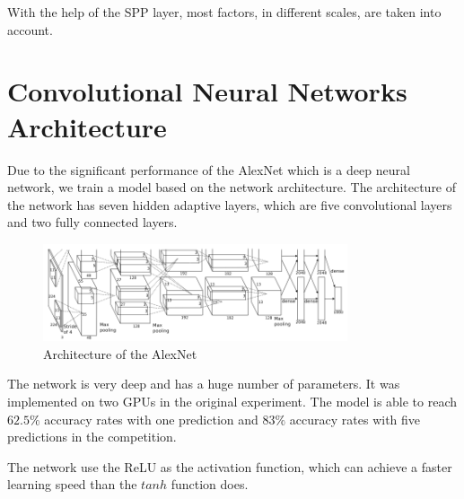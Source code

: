With the help of the SPP layer, most factors, in different scales, are taken into account.

\section{Convolutional Neural Networks Architecture}

Due to the significant performance of the AlexNet \citep{krizhevsky2012imagenet} which is a deep neural network, we train a model based on the network architecture. The architecture of the network has seven hidden adaptive layers, which are five convolutional layers and two fully connected layers.
\begin{figure}[htb]
    \centering
	\includegraphics[width=0.8\textwidth]{AlexNet.png}
    \caption{Architecture of the AlexNet \citep{krizhevsky2012imagenet}}%
    \label{fig:ImageNetArch}%
\end{figure}
The network is very deep and has a huge number of parameters. It was implemented on two GPUs in the original experiment. The model is able to reach $62.5\%$ accuracy rates with one prediction and $83\%$ accuracy rates with five predictions in the competition.

The network use the ReLU \citep{nair2010rectified} as the activation function, which can achieve a faster learning speed than the $tanh$ function does. 

